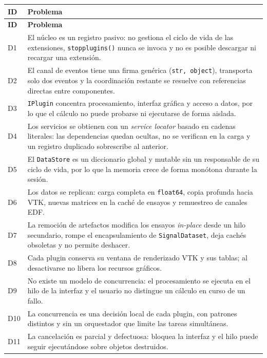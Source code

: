 \documentclass[11pt,a4paper]{article}
\DeclareRobustCommand{\_}{\textunderscore\allowbreak}
\begin{document}
\begin{center}
\small
\begin{longtable}{|>{\raggedright\arraybackslash}p{}|>{\raggedright\arraybackslash}p{}|}
\hline
\textbf{ID} & \textbf{Problema} \\
\hline
\endfirsthead
\hline
\textbf{ID} & \textbf{Problema} \\
\hline
\endhead
D1 & El núcleo es un registro pasivo: no gestiona el ciclo de vida de las extensiones, \texttt{stop\_plugins()} nunca se invoca y no es posible descargar ni recargar una extensión. \\
\hline
D2 & El canal de eventos tiene una firma genérica (\texttt{str, object}), transporta solo dos eventos y la coordinación restante se resuelve con referencias directas entre componentes.  \\
\hline
D3 & \texttt{IPlugin} concentra procesamiento, interfaz gráfica y acceso a datos, por lo que el cálculo no puede probarse ni ejecutarse de forma aislada. \\
\hline
D4 & Los servicios se obtienen con un \textit{service locator} basado en cadenas literales: las dependencias quedan ocultas, no se verifican en la carga y un registro duplicado sobrescribe al anterior. \\
\hline
D5 & El \texttt{DataStore} es un diccionario global y mutable sin un responsable de su ciclo de vida, por lo que la memoria crece de forma monótona durante la sesión. \\
\hline
D6 & Los datos se replican: carga completa en \texttt{float64}, copia profunda hacia VTK, nuevas matrices en la caché de ensayos y remuestreo de canales EDF.  \\
\hline
D7 & La remoción de artefactos modifica los ensayos \textit{in-place} desde un hilo secundario, rompe el encapsulamiento de \texttt{SignalDataset}, deja cachés obsoletas y no permite deshacer.  \\
\hline
D8 & Cada plugin conserva su ventana de renderizado VTK y sus tablas; al desactivarse no libera los recursos gráficos.  \\
\hline
D9 & No existe un modelo de concurrencia: el procesamiento se ejecuta en el hilo de la interfaz y el usuario no distingue un cálculo en curso de un fallo.  \\
\hline
D10 & La concurrencia es una decisión local de cada plugin, con patrones distintos y sin un orquestador que limite las tareas simultáneas.  \\
\hline
D11 & La cancelación es parcial y defectuosa: bloquea la interfaz y el hilo puede seguir ejecutándose sobre objetos destruidos.\\

\end{longtable}
\end{center}
\end{document}
